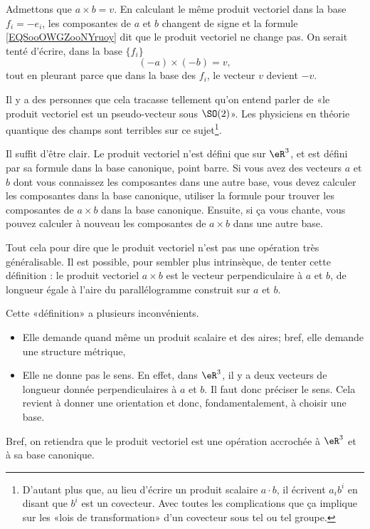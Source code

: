 \begin{normaltext}      \label{NORMooARQCooCAapiy}
	Admettons que \( a\times b=v\). En calculant le même produit vectoriel dans la base \( f_i=-e_i\), les composantes de \( a\) et \( b\) changent de signe et la formule \eqref{EQSooOWGZooNYruoy} dit que le produit vectoriel ne change pas. On serait tenté d'écrire, dans la base \( \{ f_i \}\)
	\begin{equation}
		(-a)\times (-b)=v,
	\end{equation}
	tout en pleurant parce que dans la base des \( f_i\), le vecteur \( v\) devient \( -v\).

	Il y a des personnes que cela tracasse tellement qu'on entend parler de «le produit vectoriel est un pseudo-vecteur sous \( \SO(2)\)». Les physiciens en théorie quantique des champs sont terribles sur ce sujet\footnote{D'autant plus que, au lieu d'écrire un produit scalaire \( a\cdot b\), il écrivent \( a_ib^i\) en disant que \( b^i\) est un covecteur. Avec toutes les complications que ça implique sur les «lois de transformation» d'un covecteur sous tel ou tel groupe.}.

	Il suffit d'être clair. Le produit vectoriel n'est défini que sur \( \eR^3\), et est défini par sa formule dans la base canonique, point barre. Si vous avez des vecteurs \( a\) et \( b\) dont vous connaissez les composantes dans une autre base, vous devez calculer les composantes dans la base canonique, utiliser la formule pour trouver les composantes de \( a\times b\) dans la base canonique. Ensuite, si ça vous chante, vous pouvez calculer à nouveau les composantes de \( a\times b\) dans une autre base.

	Tout cela pour dire que le produit vectoriel n'est pas une opération très généralisable. Il est possible, pour sembler plus intrinsèque, de tenter cette définition : le produit vectoriel \( a\times b\) est le vecteur perpendiculaire à \( a\) et \( b\), de longueur égale à l'aire du parallélogramme construit sur \( a\) et \( b\).

	Cette «définition» a plusieurs inconvénients.
	\begin{itemize}
		\item Elle demande quand même un produit scalaire et des aires; bref, elle demande une structure métrique,
		\item Elle ne donne pas le sens. En effet, dans \( \eR^3\), il y a deux vecteurs de longueur donnée perpendiculaires à \( a\) et \( b\). Il faut donc préciser le sens. Cela revient à donner une orientation et donc, fondamentalement, à choisir une base.
	\end{itemize}

	Bref, on retiendra que le produit vectoriel est une opération accrochée à \( \eR^3\) et à sa base canonique.
\end{normaltext}


